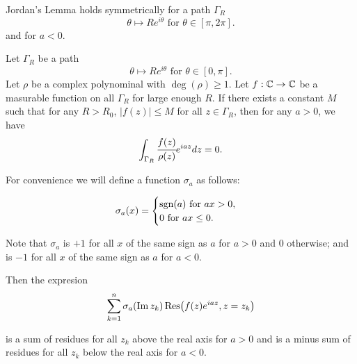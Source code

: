 \documentclass[main.tex]{subfiles}
\begin{document}
\begin{corollary}
\label{jordan-lemma-cor}
Jordan's Lemma holds symmetrically for a path $\Gamma_R$
\begin{equation}
\theta \mapsto Re^{i\theta} \text{ for } \theta\in[\pi, 2\pi].
\end{equation}
and for $a < 0$.
\end{corollary}

\begin{corollary}
Let $\Gamma_R$ be a path
\begin{equation}
\theta \mapsto Re^{i\theta} \text{ for } \theta\in[0, \pi].
\end{equation}
Let $\rho$ be a complex polynominal with $\deg(\rho) \geq 1$.
Let $f:\mathbb{C} \to \mathbb{C}$ be a masurable function on all $\Gamma_R$ for large enough $R$. 
If there exists a constant $M$ such that for any $R > R_0$, $|f(z)| \leq M$ for all $z\in\Gamma_R$, then for any $a > 0$, we have
\begin{equation}
\int_{\Gamma_R} \cfrac{f(z)}{\rho(z)} e^{iaz}dz = 0.
\end{equation}
\end{corollary}

For convenience we will define a function $\sigma_a$ as follows:

\begin{equation}
\sigma_a(x) = 
\begin{cases}
\text{sgn}(a) \text{ for } ax > 0,\\
0 \text{ for } ax \leq 0.
\end{cases}
\end{equation}

Note that $\sigma_a$ is $+1$ for all $x$ of the same sign as $a$ for $a > 0$ and $0$ otherwise; and is $-1$ for all $x$ of the same sign as $a$ for $a < 0$.

Then the expresion
\begin{equation}
\sum_{k=1}^n \sigma_a(\Im z_k) 
\Res(f(z)e^{iaz}, z=z_k)
\end{equation}

is a sum of residues for all $z_k$ above the real axis for $a > 0$ and is a minus sum of residues for all $z_k$ below the real axis for $a < 0$. 
\end{document}

